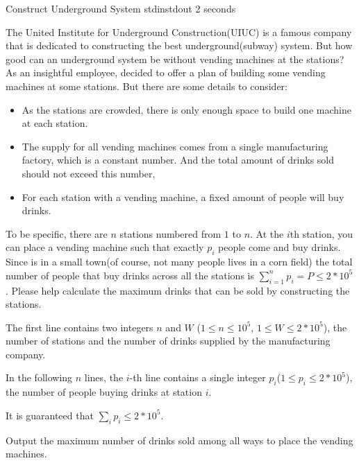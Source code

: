 \begin{problem}{Construct Underground System}
{stdin}{stdout}
{2 seconds}{}{}

The United Institute for Underground Construction(UIUC) is a famous company that is dedicated to constructing the best underground(subway) system. But how good can an underground system be without vending machines at the stations? As an insightful employee, \pittoresque decided to offer a plan of building some vending machines at some stations. But there are some details to consider:
\begin{itemize}
    \item As the stations are crowded, there is only enough space to build one machine at each station.
    \item The supply for all vending machines comes from a single manufacturing factory, which is a constant number. And the total amount of drinks sold should not exceed this number,
    \item For each station with a vending machine, a fixed amount of people will buy drinks. 
\end{itemize}

To be specific, there are $n$ stations numbered from $1$ to $n$. At the $i$th station, you can place a vending machine such that exactly $p_i$ people come and buy drinks. Since \pittoresque is in a small town(of course, not many people lives in a corn field) the total number of people that buy drinks across all the stations is $\sum_{i=1}^n p_i = P \leq 2 * 10^5$. Please help \pittoresque calculate the maximum drinks that can be sold by constructing the stations. 

\InputFile

The first line contains two integers $n$ and $W$ ($1 \le n \le 10^5$, $1 \le W \le 2 * 10^5$), the number of stations and the number of  drinks supplied by the manufacturing company.

In the following $n$ lines, the $i$-th line contains a single integer $p_i$($1 \le p_i \le 2 * 10^5$), the number of people buying drinks at station $i$.

It is guaranteed that $\sum_i p_i \leq 2 * 10^5$.

\OutputFile

Output the maximum number of drinks sold among all ways to place the vending machines.

\Examples

\begin{example}
%
\end{example}

\begin{example}
%
\end{example}



\end{problem}
